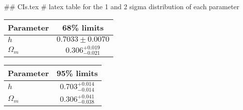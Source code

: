## CIs.tex
# latex table for the 1 and 2 sigma distribution of each parameter

\begin{tabular} { l  c}
 Parameter &  68\% limits\\
\hline
{\boldmath$h              $} & $0.7033\pm 0.0070          $\\
{\boldmath$\Omega_m       $} & $0.306^{+0.019}_{-0.021}   $\\
\hline
\end{tabular}

\begin{tabular} { l  c}
 Parameter &  95\% limits\\
\hline
{\boldmath$h              $} & $0.703^{+0.014}_{-0.014}   $\\
{\boldmath$\Omega_m       $} & $0.306^{+0.041}_{-0.038}   $\\
\hline
\end{tabular}
